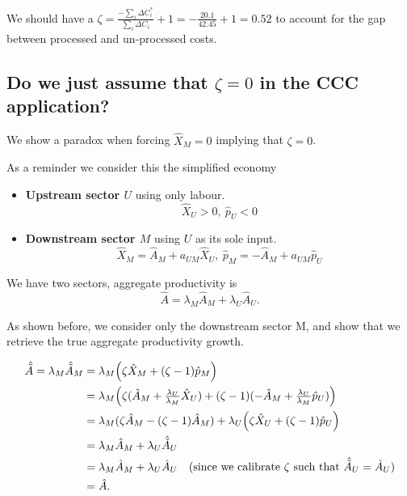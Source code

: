 \documentclass[11pt]{article}
\begin{document}
We should have a $\zeta=\frac{-\sum_i \Delta C^*_i}{\sum_i \Delta C_i}+1=-\frac{20.1}{42.45}+1=0.52$ to account for the gap between processed and un-processed costs. 



\subsection{Do we just assume that $\zeta=0$ in the CCC application?}

We show a paradox when forcing $\hat{X}_M=0$ implying that $\zeta=0$.

\vspace{3mm}

As a reminder we consider this the simplified economy
\begin{itemize}
    \item \textbf{Upstream sector $U$} using only labour. 
    \[
    \hat{X}_U > 0,~
    \hat{p}_U < 0
    \]
    \item \textbf{Downstream sector $M$} using $U$ as its sole input. 
    \[
    \hat{X}_M = \hat{A}_M+a_{UM}  \hat{X}_U,~
    \hat{p}_M = -\hat{A}_M+a_{UM}  \hat{p}_U
    \]
\end{itemize}



We have two sectors, aggregate productivity is
\begin{equation*}
    \hat{A}=\lambda_M \hat{A}_M+\lambda_U \hat{A}_U.
\end{equation*}

As shown before, we consider only the downstream sector M, and show that we retrieve the true aggregate productivity growth.

\begin{equation*}
    \begin{aligned}
    \hat{\tilde{A}}=\lambda_M  \hat{\tilde{A}}_M 
    &= \lambda_M\Bigl(\zeta \hat{X}_M + (\zeta-1) \hat{p}_M\Bigr)\\
    &= \lambda_M\Bigl(\zeta(\hat{A}_M+ \tfrac{\lambda_U}{\lambda_M} \hat{X}_U )
        +  (\zeta-1) (-\hat{A}_M+\tfrac{\lambda_U}{\lambda_M} \hat{p}_U)\Bigr)\\
    &= \lambda_M (\zeta\hat{A}_M-(\zeta-1)\hat{A}_M)+\lambda_U\Bigl(\zeta \hat{X}_U + (\zeta-1) \hat{p}_U\Bigr)\\
    &= \lambda_M \hat{A}_M+\lambda_U \hat{\tilde{A}}_U\\
    &=\lambda_M \hat{A}_M+\lambda_U \hat{A}_U\quad(\text{since we calibrate }\zeta\text{ such that }\hat{\tilde{A}}_U=\hat{A}_U)\\
    &=\hat{A}.
\end{aligned}
\end{equation*}
\end{document}
